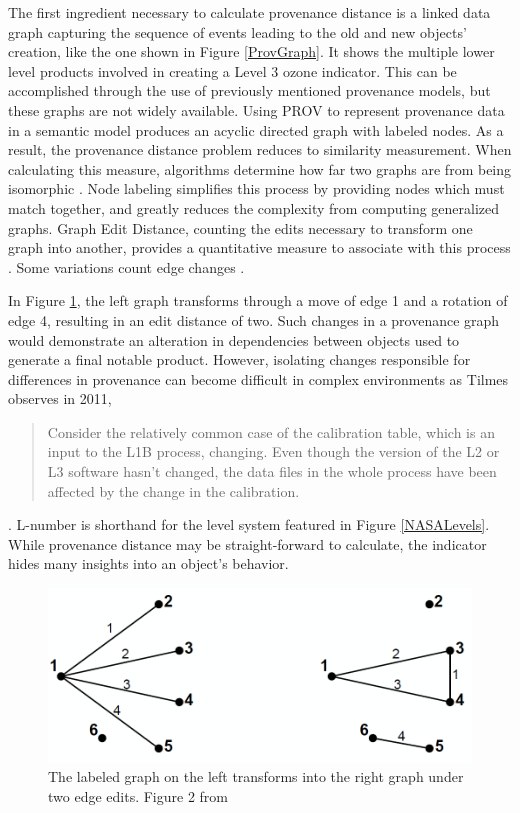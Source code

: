 The first ingredient necessary to calculate provenance distance is a linked data graph capturing the sequence of events leading to the old and new objects' creation, like the one shown in Figure \ref{ProvGraph}.
It shows the multiple lower level products involved in creating a Level 3 ozone indicator.
This can be accomplished through the use of previously mentioned provenance models, but these graphs are not widely available.
Using PROV to represent provenance data in a semantic model produces an acyclic directed graph with labeled nodes.
As a result, the provenance distance problem reduces to similarity measurement.
When calculating this measure, algorithms determine how far two graphs are from being isomorphic \cite{Cao2013}.
Node labeling simplifies this process by providing nodes which must match together, and greatly reduces the complexity from computing generalized graphs.
Graph Edit Distance, counting the edits necessary to transform one graph into another, provides a quantitative measure to associate with this process  \cite{Gao2010}.
Some variations count edge changes \cite{Goddard:1996:DGU:246962.246972}.

In Figure \ref{GraphEdit}, the left graph transforms through a move of edge 1 and a rotation of edge 4, resulting in an edit distance of two.
Such changes in a provenance graph would demonstrate an alteration in dependencies between objects used to generate a final notable product.
However, isolating changes responsible for differences in provenance can become difficult in complex environments as Tilmes observes in 2011, 
\begin{quotation}
	Consider the relatively common case of the calibration table, which is an input to the L1B process, changing. Even though the version of the L2 or L3 software hasn't changed, the data files in the whole process have been affected by the change in the calibration.
\end{quotation} \cite{TILMES2011548}.
L-number is shorthand for the level system featured in Figure \ref{NASALevels}.
While provenance distance may be straight-forward to calculate, the indicator hides many insights into an object's behavior.

\begin{figure}
	\centering
	\includegraphics[scale=0.40]{figures/GraphEdit.png}
	\caption[The labeled graph on the left transforms into the right graph under two edge edits.]{The labeled graph on the left transforms into the right graph under two edge edits. Figure 2 from \cite{Goddard:1996:DGU:246962.246972}}
	\label{GraphEdit}
\end{figure}

